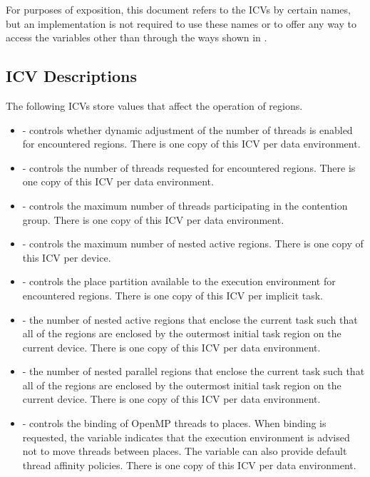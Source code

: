 For purposes of exposition, this document refers to the ICVs by certain names, but an
implementation is not required to use these names or to offer any way to access the
variables other than through the ways shown in
.



\subsection{ICV Descriptions}
\label{subsec:ICV Descriptions}
The following ICVs store values that affect the operation of  regions.

\begin{itemize}
\item {} - controls whether dynamic adjustment of the number of threads 
      is enabled for encountered  regions. There is one copy of this 
      ICV per data environment.
\item {} - controls the number of threads requested for encountered 
       regions. There is one copy of this ICV per data environment.
\item {} - controls the maximum number of threads participating 
      in the contention group. There is one copy of this ICV per data environment.
\item {} - controls the maximum number of nested active 
       regions. There is one copy of this ICV per device.
\item {} - controls the place partition available to the 
      execution environment for encountered  regions. There is one 
      copy of this ICV per implicit task.
\item {} - the number of nested active  regions 
      that enclose the current task such that all of the  regions are 
      enclosed by the outermost initial task region on the current device. There is 
      one copy of this ICV per data environment.
\item {} - the number of nested parallel regions that enclose the 
      current task such that all of the  regions are enclosed by the 
      outermost initial task region on the current device. There is one copy of this 
      ICV per data environment.
\item {} - controls the binding of OpenMP threads to places. When binding 
      is requested, the variable indicates that the execution environment is advised 
      not to move threads between places. The variable can also provide default thread 
      affinity policies. There is one copy of this ICV per data environment.
\end{itemize}

